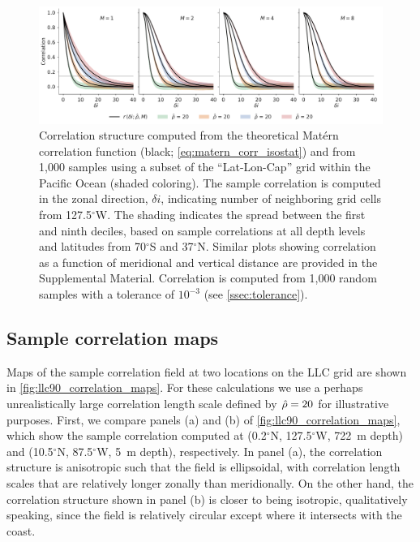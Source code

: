 \begin{figure}
    \centering
    \includegraphics[width=\textwidth]{../figures/matern_llc90_correlation_theory_vs_m_ix.pdf}
    \caption{Correlation structure computed from the theoretical Mat\'ern
        correlation function (black; \cref{eq:matern_corr_isostat}) and from
        1,000 samples using a subset of the ``Lat-Lon-Cap'' grid within the
        Pacific Ocean (shaded coloring).
        The sample correlation is computed in the zonal direction, $\delta i$,
        indicating number of neighboring grid cells from
        127.5$^\circ$W.
        The shading indicates the spread between the first and ninth deciles,
        based on sample correlations at all depth levels and latitudes from
        70$^\circ$S and 37$^\circ$N.
        Similar plots showing correlation as a function of meridional and
        vertical distance are provided in the Supplemental Material.
        Correlation is computed from 1,000 random samples with a tolerance of
        $10^{-3}$ (see \cref{ssec:tolerance}).
    }
    \label{fig:llc90_correlations}
\end{figure}

\subsection{Sample correlation maps}
\label{ssec:llc90_correlation_maps}

Maps of the sample correlation field at two locations on the LLC
grid are shown in
\cref{fig:llc90_correlation_maps}.
For these calculations we use a perhaps unrealistically large correlation length scale
defined by $\hat{\rho}=20$ for illustrative purposes.
First, we compare panels (a) and (b) of \cref{fig:llc90_correlation_maps}, which
show the sample correlation computed at
(0.2$^\circ$N, 127.5$^\circ$W, 722~m depth) and
(10.5$^\circ$N, 87.5$^\circ$W, 5~m depth), respectively.
In panel (a), the correlation structure is anisotropic such that the field is
ellipsoidal, with correlation length scales that are
relatively longer zonally than meridionally.
On the other hand, the correlation structure shown in panel (b) is closer to
being isotropic, qualitatively speaking, since the field is relatively circular
except where it intersects with the coast.

